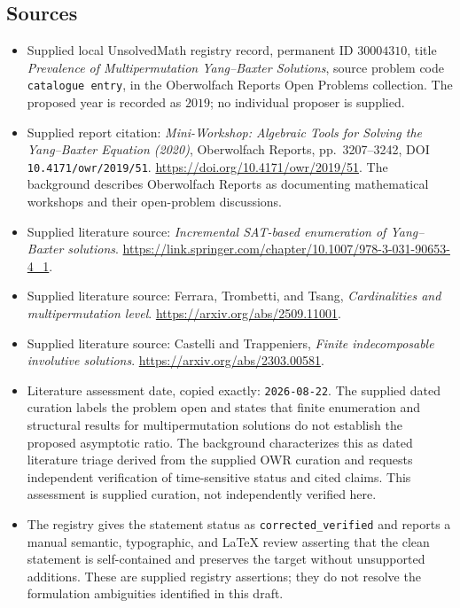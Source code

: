 \documentclass[11pt]{article}
\begin{document}
\subsection{Sources}
\begin{itemize}
\item Supplied local UnsolvedMath registry record, permanent ID \(30004310\), title \emph{Prevalence of Multipermutation Yang--Baxter Solutions}, source problem code \texttt{catalogue entry}, in the Oberwolfach Reports Open Problems collection. The proposed year is recorded as \(2019\); no individual proposer is supplied.
\item Supplied report citation: \emph{Mini-Workshop: Algebraic Tools for Solving the Yang--Baxter Equation (2020)}, Oberwolfach Reports, pp.~3207--3242, DOI \texttt{10.4171/owr/2019/51}. \url{https://doi.org/10.4171/owr/2019/51}. The background describes Oberwolfach Reports as documenting mathematical workshops and their open-problem discussions.
\item Supplied literature source: \emph{Incremental SAT-based enumeration of Yang--Baxter solutions}. \url{https://link.springer.com/chapter/10.1007/978-3-031-90653-4_1}.
\item Supplied literature source: Ferrara, Trombetti, and Tsang, \emph{Cardinalities and multipermutation level}. \url{https://arxiv.org/abs/2509.11001}.
\item Supplied literature source: Castelli and Trappeniers, \emph{Finite indecomposable involutive solutions}. \url{https://arxiv.org/abs/2303.00581}.
\item Literature assessment date, copied exactly: \texttt{2026-08-22}. The supplied dated curation labels the problem open and states that finite enumeration and structural results for multipermutation solutions do not establish the proposed asymptotic ratio. The background characterizes this as dated literature triage derived from the supplied OWR curation and requests independent verification of time-sensitive status and cited claims. This assessment is supplied curation, not independently verified here.
\item The registry gives the statement status as \texttt{corrected\_verified} and reports a manual semantic, typographic, and LaTeX review asserting that the clean statement is self-contained and preserves the target without unsupported additions. These are supplied registry assertions; they do not resolve the formulation ambiguities identified in this draft.
\end{itemize}
\end{document}
